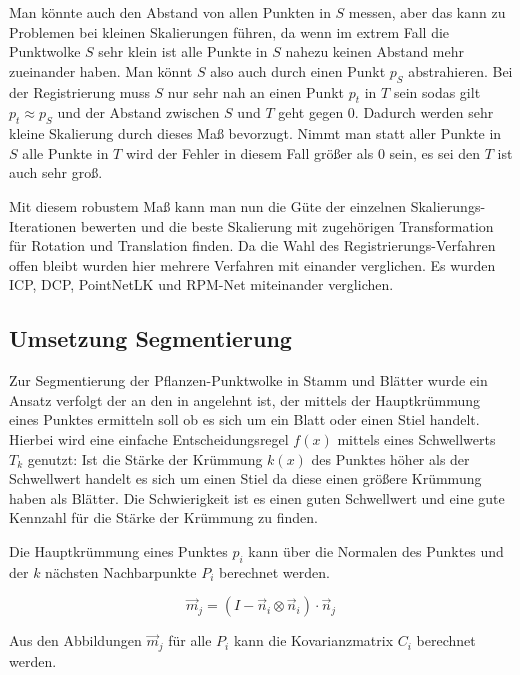 \documentclass[12pt,titlepage, twoside]{article}
\begin{document}
Man könnte auch den Abstand von allen Punkten in $S$ messen, aber das kann zu Problemen bei kleinen Skalierungen führen, da wenn im extrem Fall die Punktwolke $S$ sehr klein ist alle Punkte in $S$ nahezu keinen Abstand mehr zueinander haben.
Man könnt $S$ also auch durch einen Punkt $p_{S}$ abstrahieren.
Bei der Registrierung muss $S$ nur sehr nah an einen Punkt $p_t$ in $T$ sein sodas gilt $p_t \approx p_S$ und der Abstand zwischen $S$ und $T$ geht gegen $0$. Dadurch werden sehr kleine Skalierung durch dieses Maß bevorzugt.
Nimmt man statt aller Punkte in $S$ alle Punkte in $T$ wird der Fehler in diesem Fall größer als 0 sein, es sei den $T$ ist auch sehr groß.

Mit diesem robustem Maß kann man nun die Güte der einzelnen Skalierungs-Iterationen bewerten und die beste Skalierung mit zugehörigen Transformation für Rotation und Translation finden.
Da die Wahl des Registrierungs-Verfahren offen bleibt wurden hier mehrere Verfahren mit einander verglichen. Es wurden ICP, DCP, PointNetLK und RPM-Net miteinander verglichen.

\subsection{Umsetzung Segmentierung}
\label{sec:realisierung:implementierung3}

Zur Segmentierung der Pflanzen-Punktwolke in Stamm und Blätter wurde ein Ansatz verfolgt der an den in \cite{ThreeBasics} angelehnt ist, der mittels der Hauptkrümmung eines Punktes ermitteln soll ob es sich um ein Blatt oder einen Stiel handelt. 
Hierbei wird eine einfache Entscheidungsregel $f(x)$ mittels eines Schwellwerts $T_k$ genutzt: Ist die Stärke der Krümmung $k(x)$ des Punktes höher als der Schwellwert handelt es sich um einen Stiel da diese einen größere Krümmung haben als Blätter.
Die Schwierigkeit ist es einen guten Schwellwert und eine gute Kennzahl für die Stärke der Krümmung zu finden.

Die Hauptkrümmung eines Punktes $p_i$ kann über die Normalen des Punktes und der $k$ nächsten Nachbarpunkte $P_i$ berechnet werden.

\begin{equation}
\label{eq:hauptkruemmung:1}
\vec{m}_j = (I - \vec{n}_i \otimes \vec{n}_i ) \cdot \vec{n}_j
\end{equation}

Aus den Abbildungen $\vec{m}_j$ für alle $P_i$ kann die Kovarianzmatrix $C_i$ berechnet werden.
\end{document}
